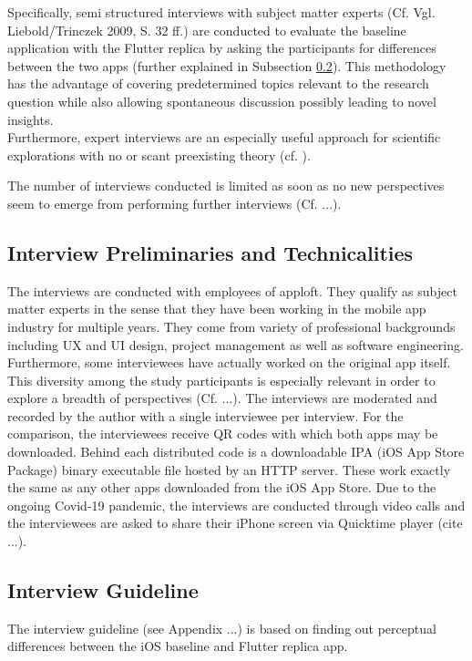 Specifically, semi structured interviews with subject matter experts (Cf. Vgl. Liebold/Trinczek 2009, S. 32 ff.) are conducted to evaluate the baseline application
with the Flutter replica by asking the participants for differences between the two apps (further explained in Subsection \ref{subsection::interview_guideline}). This methodology has the
advantage of covering predetermined topics relevant to the research question while also allowing spontaneous discussion possibly leading to novel insights.\\
Furthermore, expert interviews are an especially useful approach for scientific explorations
with no or scant preexisting theory (cf. \cite{Experts2009}).

The number of interviews conducted is limited as soon as no new perspectives seem to emerge from performing further interviews (Cf. ...).


\subsection{Interview Preliminaries and Technicalities}
The interviews are conducted with employees of apploft. They qualify as subject matter experts in the sense that they have been working in the mobile app industry for multiple years. They come from variety
of professional backgrounds including UX and UI design, project management as well as software engineering. Furthermore, some interviewees have actually worked on the original app itself. This diversity 
among the study participants is especially relevant in order to explore a breadth of perspectives (Cf. ...). 
The interviews are moderated and recorded by the author with a single interviewee per interview.
For the comparison, the interviewees receive QR codes with which both apps may be downloaded. Behind each distributed code is a downloadable IPA (iOS App Store Package) binary executable file hosted by an HTTP server.
These work exactly the same as any other apps downloaded from the iOS App Store.
Due to the ongoing Covid-19 pandemic, the interviews are conducted through video calls and the interviewees are asked to share their iPhone screen via Quicktime player (cite ...).

\subsection{Interview Guideline} \label{subsection::interview_guideline}
The interview guideline (see Appendix ...) is based on finding out perceptual differences between the iOS baseline and Flutter replica app. 

